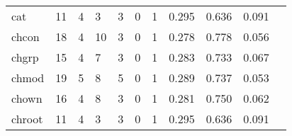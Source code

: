 \begin{longtable}{lp{1.2cm}p{1.2cm}p{1.2cm}p{1.2cm}p{1.2cm}p{1.2cm}p{1.2cm}p{1.2cm}p{1.2cm}p{1.2cm}}
cat       &                                    11 &                                                  4 &                                                  3 &                                                  3 &                                                  0 &                                                  1 &                                         0.295 &                                              0.636 &                                              0.091 \\
chcon     &                                    18 &                                                  4 &                                                 10 &                                                  3 &                                                  0 &                                                  1 &                                         0.278 &                                              0.778 &                                              0.056 \\
chgrp     &                                    15 &                                                  4 &                                                  7 &                                                  3 &                                                  0 &                                                  1 &                                         0.283 &                                              0.733 &                                              0.067 \\
chmod     &                                    19 &                                                  5 &                                                  8 &                                                  5 &                                                  0 &                                                  1 &                                         0.289 &                                              0.737 &                                              0.053 \\
chown     &                                    16 &                                                  4 &                                                  8 &                                                  3 &                                                  0 &                                                  1 &                                         0.281 &                                              0.750 &                                              0.062 \\
chroot    &                                    11 &                                                  4 &                                                  3 &                                                  3 &                                                  0 &                                                  1 &                                         0.295 &                                              0.636 &                                              0.091 \\

\end{longtable}
